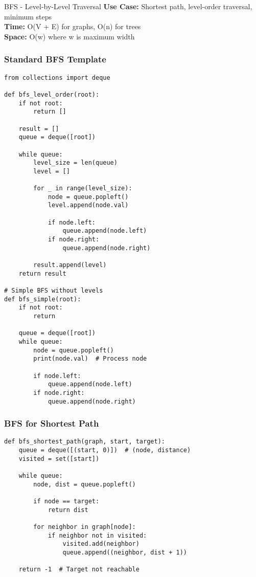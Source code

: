 \documentclass[10pt,a4paper]{article}
\begin{document}
\begin{patternbox}{BFS - Level-by-Level Traversal}
\textbf{Use Case:} Shortest path, level-order traversal, minimum steps\\
\textbf{Time:} O(V + E) for graphs, O(n) for trees\\
\textbf{Space:} O(w) where w is maximum width
\end{patternbox}

\subsubsection{Standard BFS Template}
\begin{lstlisting}
from collections import deque

def bfs_level_order(root):
    if not root:
        return []

    result = []
    queue = deque([root])

    while queue:
        level_size = len(queue)
        level = []

        for _ in range(level_size):
            node = queue.popleft()
            level.append(node.val)

            if node.left:
                queue.append(node.left)
            if node.right:
                queue.append(node.right)

        result.append(level)
    return result

# Simple BFS without levels
def bfs_simple(root):
    if not root:
        return

    queue = deque([root])
    while queue:
        node = queue.popleft()
        print(node.val)  # Process node

        if node.left:
            queue.append(node.left)
        if node.right:
            queue.append(node.right)
\end{lstlisting}

\subsubsection{BFS for Shortest Path}
\begin{lstlisting}
def bfs_shortest_path(graph, start, target):
    queue = deque([(start, 0)])  # (node, distance)
    visited = set([start])

    while queue:
        node, dist = queue.popleft()

        if node == target:
            return dist

        for neighbor in graph[node]:
            if neighbor not in visited:
                visited.add(neighbor)
                queue.append((neighbor, dist + 1))

    return -1  # Target not reachable
\end{lstlisting}
\end{document}
